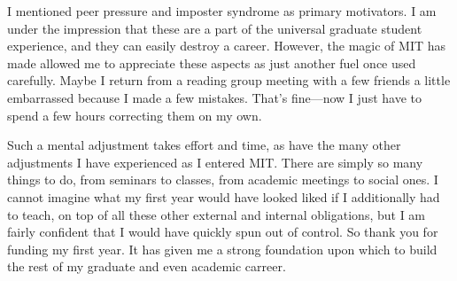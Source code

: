 \documentclass{article}
\begin{document}
I mentioned peer pressure and imposter syndrome as primary motivators. I am under the impression that these are a part of the universal graduate student experience, and they can easily destroy a career. However, the magic of MIT has made allowed me to appreciate these aspects as just another fuel once used carefully. Maybe I return from a reading group meeting with a few friends a little embarrassed because I made a few mistakes. That's fine---now I just have to spend a few hours correcting them on my own.

Such a mental adjustment takes effort and time, as have the many other adjustments I have experienced as I entered MIT. There are simply so many things to do, from seminars to classes, from academic meetings to social ones. I cannot imagine what my first year would have looked liked if I additionally had to teach, on top of all these other external and internal obligations, but I am fairly confident that I would have quickly spun out of control. So thank you for funding my first year. It has given me a strong foundation upon which to build the rest of my graduate and even academic carreer.
\end{document}

